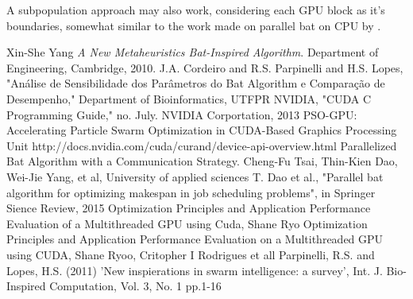 \documentclass[conference]{IEEEtran}
\begin{document}
A subpopulation approach may also work, considering each GPU block as
it's boundaries, somewhat similar to the work made on parallel bat on
CPU by \cite{paralellCPU}.

\begin{thebibliography}{1}
    Xin-She Yang \emph{A New Metaheuristics Bat-Inspired Algorithm}. Department of Engineering, Cambridge, 2010.
    J.A. Cordeiro and R.S. Parpinelli and H.S. Lopes, "Análise de Sensibilidade dos Parâmetros do Bat Algorithm e Comparação de Desempenho," Department of Bioinformatics, UTFPR
    NVIDIA, "CUDA C Programming Guide," no. July. NVIDIA Corportation, 2013
    PSO-GPU: Accelerating Particle Swarm Optimization in CUDA-Based Graphics Processing Unit
    http://docs.nvidia.com/cuda/curand/device-api-overview.html
    Parallelized Bat Algorithm with a Communication Strategy. Cheng-Fu Tsai, Thin-Kien Dao, Wei-Jie Yang, et al, University of applied sciences
    T. Dao et al.,  "Parallel bat algorithm for optimizing makespan in job scheduling problems", in Springer Sience Review, 2015
    Optimization Principles and Application Performance Evaluation of a Multithreaded GPU using Cuda, Shane Ryo
    Optimization Principles and Application Performance Evaluation on a Multithreaded GPU using CUDA, Shane Ryoo, Critopher I Rodrigues et all
    Parpinelli, R.S. and Lopes, H.S. (2011) 'New inspierations in swarm intelligence: a survey', Int. J. Bio-Inspired Computation, Vol. 3, No. 1 pp.1-16

\end{thebibliography}
\end{document}
